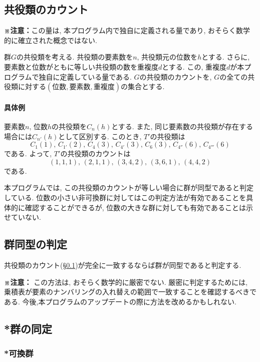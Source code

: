 \documentclass[11pt, a4paper]{jsarticle}
\begin{document}
\subsection{共役類のカウント}\label{sec:conjugacy_count}
\textbf{※注意：}この量は, 本プログラム内で独自に定義される量であり, おそらく数学的に確立された概念ではない.

群$G$の共役類を考える.
共役類の要素数を$n$, 共役類元の位数を$h$とする.
さらに, 要素数と位数がともに等しい共役類の数を重複度$d$とする.
この, 重複度$d$が本プログラムで独自に定義している量である.
$G$の共役類のカウントを, $G$の全ての共役類に対する$(位数, 要素数, 重複度)$の集合とする.

\paragraph{具体例}
要素数$n$, 位数$h$の共役類を$C_n(h)$とする.
また, 同じ要素数の共役類が存在する場合には$C_{n'}(h)$として区別する.
このとき, $T'$の共役類は
\begin{equation}
	C_1(1),\,C_{1'}(2),\,C_{4}(3),\,C_{4'}(3),\,C_{6}(3),\,C_{4''}(6),\,C_{4'''}(6)
\end{equation}
である.
よって, $T'$の共役類のカウントは
\begin{equation}
	(1,1,1),\,(2,1,1),\,(3,4,2),\,(3,6,1),\,(4,4,2)
\end{equation}
である.

本プログラムでは, この共役類のカウントが等しい場合に群が同型であると判定している.
位数の小さい非可換群に対してはこの判定方法が有効であることを具体的に確認することができるが, 位数の大きな群に対しても有効であることは示せていない.

\subsection{群同型の判定}
共役類のカウント(\S\ref{sec:conjugacy_count})が完全に一致するならば群が同型であると判定する.

\textbf{※注意：}
この方法は, おそらく数学的に厳密でない.
厳密に判定するためには, 乗積表が要素のナンバリングの入れ替えの範囲で一致することを確認するべきである.
今後,本プログラムのアップデートの際に方法を改めるかもしれない.

\subsection{*群の同定}
\subsubsection{*可換群}
\end{document}
